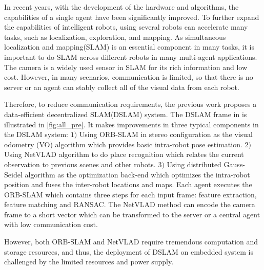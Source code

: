\label{sec:introdutction}
In recent years, with the development of the hardware and algorithms, the capabilities of a single agent have been significantly improved.
To further expand the capabilities of intelligent robots, using several robots can accelerate many tasks, such as localization, exploration, and mapping.
As simultaneous localization and mapping(SLAM) is an essential component in many tasks, it is important to do SLAM across different robots in many multi-agent applications. 
The camera is a widely used sensor in SLAM for its rich information and low cost. 
However, in many scenarios, communication is limited, so that there is no server or an agent can stably collect all of the visual data from each robot.

Therefore, to reduce communication requirements, the previous work \cite{Cieslewski:20187ee} proposes a data-efficient decentralized SLAM(DSLAM) system. 
The DSLAM frame in \cite{Cieslewski:20187ee} is illustrated in \cref{fig:all_pre}.
It makes improvements in three typical components in the DSLAM system: $1)$ Using ORB-SLAM \cite{Mur-Artal:2017281} in stereo configuration as the visual odometry (VO) algorithm which provides basic intra-robot pose estimation. $2)$ Using NetVLAD \cite{Arandjelovic:2017997} algorithm to do place recognition which relates the current observation to previous scenes and other robots. $3)$ Using distributed Gauss-Seidel algorithm \cite{bertsekas1989} as the optimization back-end which optimizes the intra-robot position and fuses the inter-robot locations and maps. Each agent executes the ORB-SLAM which contains three steps for each input frame: feature extraction, feature matching and RANSAC. The NetVLAD method can encode the camera frame to a short vector which can be transformed to the server or a central agent with low communication cost.

However, both ORB-SLAM and NetVLAD require tremendous computation and storage resources, and thus, the deployment of DSLAM on embedded system is challenged by the limited resources and power supply.

% 


